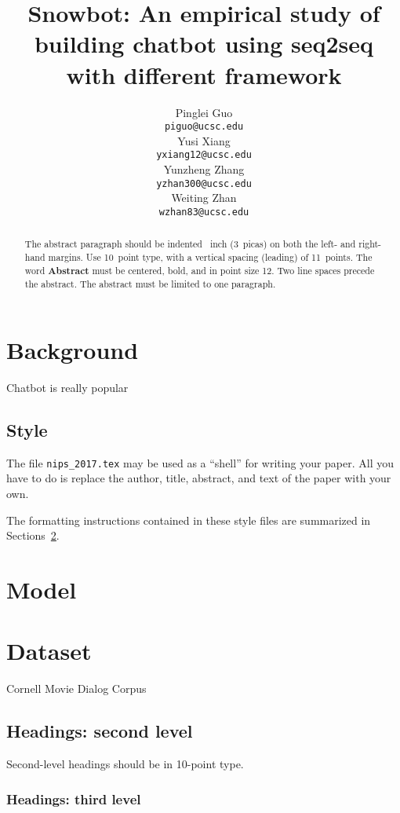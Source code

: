\documentclass{article}
\title{Snowbot: An empirical study of building chatbot using seq2seq with different framework}
\author{
Pinglei Guo \\
\texttt{piguo@ucsc.edu} \\
\And
Yusi Xiang \\
\texttt{yxiang12@ucsc.edu} \\
\And
Yunzheng Zhang \\
\texttt{yzhan300@ucsc.edu} \\
\And
Weiting Zhan \\
\texttt{wzhan83@ucsc.edu} \\
}
\begin{document}

\maketitle

\begin{abstract}
    The abstract paragraph should be indented ~inch
    (3~picas) on both the left- and right-hand margins. Use 10~point
    type, with a vertical spacing (leading) of 11~points. The word
    \textbf{Abstract} must be centered, bold, and in point size 12. Two
    line spaces precede the abstract. The abstract must be limited to
    one paragraph.
\end{abstract}

\section{Background}

Chatbot is really popular

\subsection{Style}

The file \verb+nips_2017.tex+ may be used as a ``shell'' for writing
your paper. All you have to do is replace the author, title, abstract,
and text of the paper with your own.

The formatting instructions contained in these style files are
summarized in Sections~\ref{sec:model}.

\section{Model}
\label{sec:model}


\section{Dataset}
\label{sec:dataset}

Cornell Movie Dialog Corpus~\cite{data:cornell}

\subsection{Headings: second level}

Second-level headings should be in 10-point type.

\subsubsection{Headings: third level}
\end{document}

